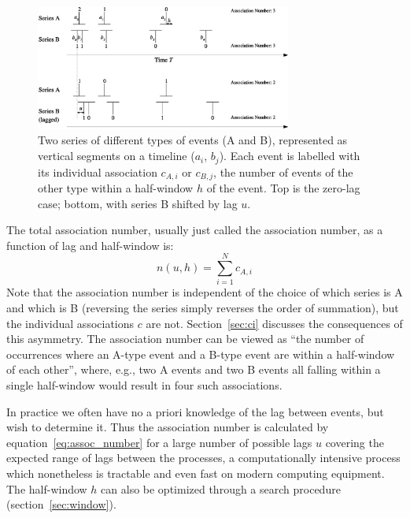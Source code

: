 \documentclass[letterpaper,11pt]{article}
\begin{document}
\begin{figure}
\begin{center}
\includegraphics[width=0.75\textwidth]{figures/series_example.eps}
\caption{\label{fig:series_example}Two series of different types of
events (A and B), represented as vertical segments on a timeline
($a_i$, $b_j$).  Each event is labelled with its individual
association $c_{A,i}$ or $c_{B,j}$, the number of events of the other
type within a half-window $h$ of the event.  Top is the zero-lag case;
bottom, with series B shifted by lag $u$.}
\end{center}
\end{figure}

The total association number, usually just called the association
number, as a function of lag and half-window is:
\begin{equation}
\label{eq:assoc_total}
n(u, h) = \sum\limits_{i=1}^N c_{A,i}
\end{equation}
Note that the association number is independent of the choice of which
series is A and which is B (reversing the series simply reverses the
order of summation), but the individual associations $c$ are
not. Section~\ref{sec:ci} discusses the consequences of this
asymmetry. The association number can be viewed as ``the number of
occurrences where an A-type event and a B-type event are within a
half-window of each other'', where, e.g., two A events and two B events
all falling within a single half-window would result in four such
associations.

In practice we often have no a priori knowledge of the lag between
events, but wish to determine it. Thus the
association number is calculated by equation~\ref{eq:assoc_number} for
a large number of possible lags $u$ covering the expected range of
lags between the processes, a computationally intensive process which
nonetheless is tractable and even fast on modern computing
equipment. The half-window $h$ can also be optimized through a search
procedure (section~\ref{sec:window}).
\end{document}
